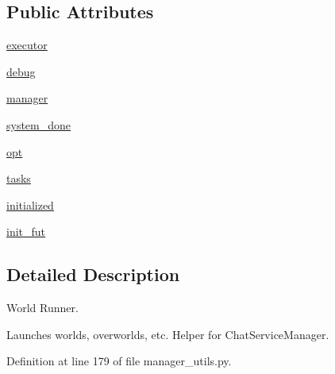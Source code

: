 \subsection*{Public Attributes}
\begin{DoxyCompactItemize}
\item 
\hyperlink{classparlai_1_1chat__service_1_1core_1_1manager__utils_1_1ChatServiceWorldRunner_aa9cd644d7c035fcb41980005d259947f}{executor}
\item 
\hyperlink{classparlai_1_1chat__service_1_1core_1_1manager__utils_1_1ChatServiceWorldRunner_af71184b9bb3dc433adfd678b7a8097e7}{debug}
\item 
\hyperlink{classparlai_1_1chat__service_1_1core_1_1manager__utils_1_1ChatServiceWorldRunner_aebacdd9b5d3ab6a093945f22e0fe0a83}{manager}
\item 
\hyperlink{classparlai_1_1chat__service_1_1core_1_1manager__utils_1_1ChatServiceWorldRunner_a4fcbda4053e9103d38301f0039674ed9}{system\+\_\+done}
\item 
\hyperlink{classparlai_1_1chat__service_1_1core_1_1manager__utils_1_1ChatServiceWorldRunner_aa4e0d4e5b87f4c136b0750cea2c339be}{opt}
\item 
\hyperlink{classparlai_1_1chat__service_1_1core_1_1manager__utils_1_1ChatServiceWorldRunner_a09f6b502ea55829cd883a8ef4e9ac6d4}{tasks}
\item 
\hyperlink{classparlai_1_1chat__service_1_1core_1_1manager__utils_1_1ChatServiceWorldRunner_ab7df2acb8fc34308b4cb274244d199b7}{initialized}
\item 
\hyperlink{classparlai_1_1chat__service_1_1core_1_1manager__utils_1_1ChatServiceWorldRunner_ab801d33992381060a8925ec977457d99}{init\+\_\+fut}
\end{DoxyCompactItemize}


\subsection{Detailed Description}
\begin{DoxyVerb}World Runner.

Launches worlds, overworlds, etc. Helper for ChatServiceManager.
\end{DoxyVerb}
 

Definition at line 179 of file manager\+\_\+utils.\+py.



